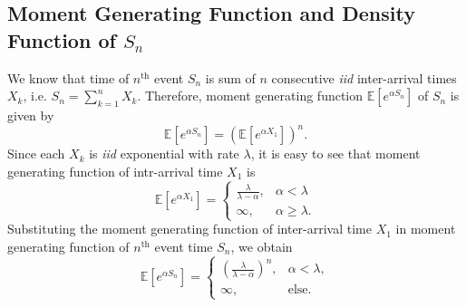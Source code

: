 \documentclass[a4paper,10pt]{article}
\begin{document}
\subsection{Moment Generating Function and Density Function of $S_n$}
We know that time of $n^{\mathrm{th}}$ event $S_n$ is sum of $n$ consecutive \emph{iid} inter-arrival times $X_k$, i.e. $S_n = \sum^{n}_{k=1}X_{k}$. Therefore, moment generating function $\mathbb{E} [ e^{\alpha S_{n}} ]$ of $S_n$ is given by 
 \begin{equation*}
  \mathbb{E} [ e^{\alpha S_{n}} ] = \left(\mathbb{E}[e^{\alpha X_{1}}]\right)^{n}. 
 \end{equation*} 
Since each $X_k$ is \emph{iid} exponential with rate $\lambda$, it is easy to see that moment generating function of intr-arrival time $X_1$ is 
 \begin{equation*}
  \mathbb{E} [ e^{\alpha X_1} ] = 
		\begin{cases}
		\frac{\lambda}{\lambda-\alpha}, & \alpha < \lambda \\
		\infty, & \alpha \geqslant \lambda.
		\end{cases} 
 \end{equation*} 
Substituting the moment generating function of inter-arrival time $X_1$ in moment generating function of $n^{\mathrm{th}}$ event time $S_n$, we obtain
\begin{equation*}
   \mathbb{E}[e^{\alpha S_{n}}] = 
	\begin{cases} 
	\left(\frac{\lambda}{\lambda-\alpha}\right)^{n}, & \alpha < \lambda, \\
   \infty, &\text{else}.
	\end{cases}
\end{equation*}
\end{document}
